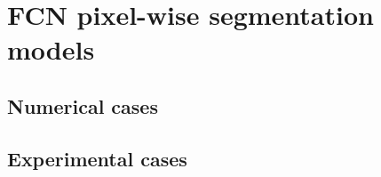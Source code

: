 \section{FCN pixel-wise segmentation models}
\label{sec52}


\lipsum[1]

\subsection{Numerical cases}
\label{sec521}

\lipsum[1]

\subsection{Experimental cases}
\label{sec522}

\lipsum[1]

